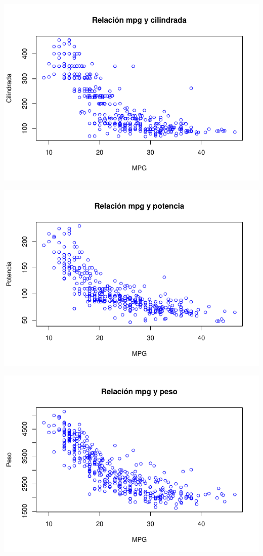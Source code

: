 \documentclass[]{article}
\begin{document}
\includegraphics{TrabajoPracticas3_files/figure-latex/unnamed-chunk-4-1.pdf}

\includegraphics{TrabajoPracticas3_files/figure-latex/unnamed-chunk-6-1.pdf}

\includegraphics{TrabajoPracticas3_files/figure-latex/unnamed-chunk-8-1.pdf}
\end{document}
